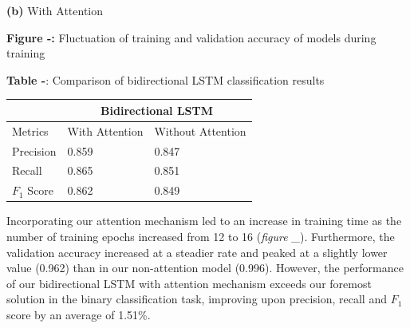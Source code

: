 \documentclass[12pt,a4paper]{article}
\begin{document}
\begin{minipage}{0.5\textwidth}
\begin{minipage}{0.48\textwidth}
\begin{center}
			\hspace{-1cm}\textbf{(b)} With Attention\\
		\end{center}
	\end{minipage}
	\vspace{-5pt}\begin{center}
		\hspace{-20pt}\textbf{Figure -:} Fluctuation of training and validation accuracy of models during training\\
	\end{center}
\end{minipage}
\hspace{-10pt}
\begin{minipage}{0.5\textwidth}
	\begin{center}
		\textbf{Table -}: Comparison of bidirectional LSTM classification results\vspace{5pt}
		\begin{tabular}{|p{1.6cm}||p{1.8cm}|p{2cm}|}
			\hline
			& \multicolumn{2}{c|}{Bidirectional LSTM} \\
			\hline
			Metrics & With Attention & Without Attention\\
			\hline\hline
			Precision & 0.859 & 0.847\\
			\hline
			Recall & 0.865 & 0.851\\
			\hline
			$F_1$ Score & 0.862 & 0.849\\
			\hline
		\end{tabular}
	\end{center}	
\end{minipage}\vspace{10pt}

\noindent Incorporating our attention mechanism led to an increase in training time as the number of training epochs increased from 12 to 16 (\textit{figure \_}). Furthermore, the validation accuracy increased at a steadier rate and peaked at a slightly lower value (0.962) than in our non-attention model (0.996). However, the performance of our bidirectional LSTM with attention mechanism exceeds our foremost solution in the binary classification task, improving upon precision, recall and $F_1$ score by an average of 1.51\%.\\
\end{document}
